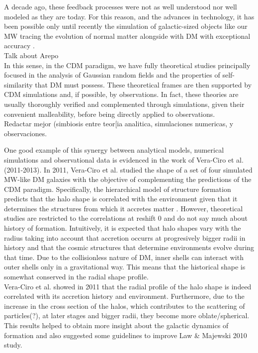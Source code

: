  A decade ago, these feedback processes were not as well understood nor well modeled as they are today. For this reason, and the advances in technology, it has been possible only until recently the simulation of galactic-sized objects like our MW tracing the evolution of normal matter alongside with DM with exceptional accuracy \cite{Auriga}.\\Talk about Arepo\\
 


In this sense, in the CDM paradigm, we have fully theoretical studies \cite{Bardeen et al. 1986,Schechter} principally focused in the analysis of Gaussian random fields and the properties of self-similarity that DM must possess. 
These theoretical frames are then supported by CDM simulations \cite{Cualquier estudio de CDM hace referencia a esos pilares} and, if possible, by observations. 
In fact, these theories are usually thoroughly verified and complemented through simulations, given their convenient malleability, before being directly applied to observations.\\ Redactar mejor (simbiosis entre teor[ia analitica, simulaciones numericas, y observaciones.

One good example of this synergy between analytical models, numerical simulations and observational data is evidenced in the work of Vera-Ciro et al. (2011-2013). In 2011, Vera-Ciro et al. studied the shape of a set of four simulated MW-like DM galaxies with the objective of complementing the predictions of the CDM paradigm. Specifically, the hierarchical model of structure formation predicts that the halo shape is correlated with the environment given that it determines the structures from which it accretes matter \cite{referencias sobre relacion entre forma y entorno}. However, theoretical studies are restricted to the correlations at reshift 0 and do not say much about history of formation. Intuitively, it is expected that halo shapes vary with the radius taking into account that accretion occurrs at progresively bigger radii in history and that the cosmic structures that determine environments evolve during that time. Due to the collisionless nature of DM, inner shells can interact with outer shells only in a gravitational way. This means that the historical shape is somewhat conserved in the radial shape profile.\\

Vera-Ciro et al.  showed in 2011 that the radial profile of the halo shape is indeed correlated with its accretion history and environment. Furthermore, due to the increase in the cross section of the halos, which contributes to the scattering of particles(?), at later stages and bigger radii, they become more oblate/spherical. This results helped to obtain more insight about the galactic dynamics of formation and also suggested some guidelines to improve Law \& Majewski 2010 study.\\

